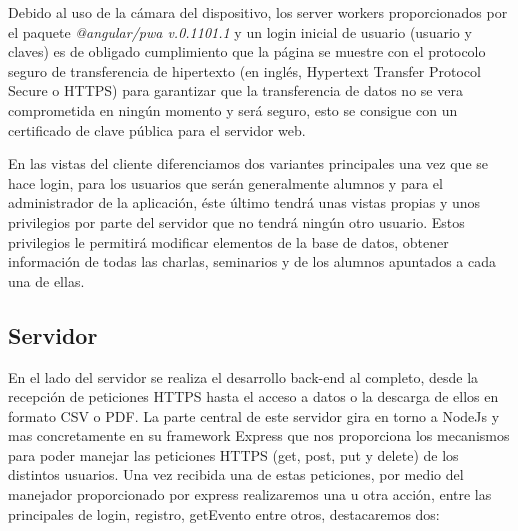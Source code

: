 \documentclass[a4paper, 12pt]{book}
\begin{document}
	Debido al uso de la cámara del dispositivo, los server workers proporcionados por el paquete \textit{@angular/pwa v.0.1101.1} y un login inicial de usuario (usuario y claves) es de obligado cumplimiento que la página se muestre con el protocolo seguro de transferencia de hipertexto (en inglés, Hypertext Transfer Protocol Secure o HTTPS)  para garantizar que la transferencia de datos no se vera comprometida en ningún momento y será seguro, esto se consigue con un certificado de clave pública para el servidor web.
	
	En las vistas del cliente diferenciamos dos variantes principales una vez que se hace login, para los usuarios que serán generalmente alumnos y para el administrador de la aplicación, éste último tendrá unas vistas propias y unos privilegios por parte del servidor que no tendrá ningún otro usuario. Estos privilegios le permitirá modificar elementos de la base de datos, obtener información de todas las charlas, seminarios y de los alumnos apuntados a cada una de ellas.

	
\subsection{Servidor}
	En el lado del servidor se realiza el desarrollo back-end al completo, desde la recepción de peticiones HTTPS hasta el acceso a datos o la descarga de ellos en formato CSV o PDF.
	La parte central de este servidor gira en torno a NodeJs y mas concretamente en su framework Express que nos proporciona los mecanismos para poder manejar las peticiones HTTPS (get, post, put y delete) de los distintos usuarios. Una vez recibida una de estas peticiones, por medio del manejador proporcionado por express realizaremos una u otra acción, entre las principales de login, registro, getEvento entre otros, destacaremos dos:
	
\end{document}
